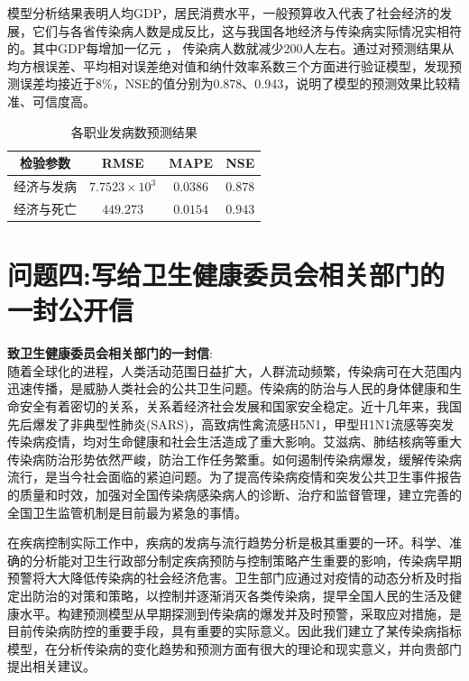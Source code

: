 \documentclass{whutmod}
\begin{document}
  模型分析结果表明人均GDP，居民消费水平，一般预算收入代表了社会经济的发展，它们与各省传染病人数是成反比，这与我国各地经济与传染病实际情况实相符的。其中GDP每增加一亿元 ， 传染病人数就减少200人左右。通过对预测结果从均方根误差、平均相对误差绝对值和纳什效率系数三个方面进行验证模型，发现预测误差均接近于8\%，NSE的值分别为0.878、0.943，说明了模型的预测效果比较精准、可信度高。
  \begin{table}[H]
  	\centering\caption{各职业发病数预测结果}\label{zhiye1}
  	\begin{tabular}{cccc}
  		\toprule[1.5pt]
  		\multicolumn{1}{m{2cm}}{\centering 检验参数}
  		& \multicolumn{1}{m{1.8cm}}{\centering RMSE}
  		& \multicolumn{1}{m{1.8cm}}{\centering MAPE}
  		& \multicolumn{1}{m{1.8cm}}{\centering NSE}
  		\\
  		\midrule[0.5pt]	
  		经济与发病 &  $7.7523\times10^{3}$&$0.0386$&$0.878$
  		\\ 
  		经济与死亡 &  $449.273$&$0.0154$&$0.943$\\
  		\bottomrule[1.5pt]	
  	\end{tabular}
  \end{table}
  
  
  
  \section{问题四:写给卫生健康委员会相关部门的一封公开信}
  \textbf{致卫生健康委员会相关部门的一封信}:
  ~\\
  
  随着全球化的进程，人类活动范围日益扩大，人群流动频繁，传染病可在大范围内迅速传播，是威胁人类社会的公共卫生问题。传染病的防治与人民的身体健康和生命安全有着密切的关系，关系着经济社会发展和国家安全稳定。近十几年来，我国先后爆发了非典型性肺炎(SARS)，高致病性禽流感H5N1，甲型H1N1流感等突发传染病疫情，均对生命健康和社会生活造成了重大影响。艾滋病、肺结核病等重大传染病防治形势依然严峻，防治工作任务繁重。如何遏制传染病爆发，缓解传染病流行，是当今社会面临的紧迫问题。为了提高传染病疫情和突发公共卫生事件报告的质量和时效，加强对全国传染病感染病人的诊断、治疗和监督管理，建立完善的全国卫生监管机制是目前最为紧急的事情。
  
  在疾病控制实际工作中，疾病的发病与流行趋势分析是极其重要的一环。科学、准确的分析能对卫生行政部分制定疾病预防与控制策略产生重要的影响，传染病早期预警将大大降低传染病的社会经济危害。卫生部门应通过对疫情的动态分析及时指定出防治的对策和策略，以控制并逐渐消灭各类传染病，提早全国人民的生活及健康水平。构建预测模型从早期探测到传染病的爆发并及时预警，采取应对措施，是目前传染病防控的重要手段，具有重要的实际意义。因此我们建立了某传染病指标模型，在分析传染病的变化趋势和预测方面有很大的理论和现实意义，并向贵部门提出相关建议。
  
\end{document}
